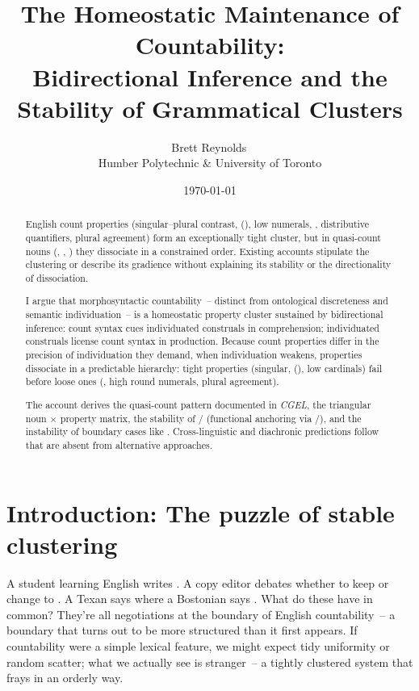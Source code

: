 \documentclass[12pt,a4paper]{article}
\title{The Homeostatic Maintenance of Countability:\\Bidirectional Inference and the Stability of Grammatical Clusters}
\author{Brett Reynolds\,\orcidlink{0000-0003-0073-7195}\\Humber Polytechnic \& University of Toronto}
\date{\today}
\begin{document}
\maketitle

\begin{abstract}
English count properties (singular--plural contrast, (), low numerals, , distributive quantifiers, plural agreement) form an exceptionally tight cluster, but in quasi-count nouns (, , ) they dissociate in a constrained order. Existing accounts stipulate the clustering or describe its gradience without explaining its stability or the directionality of dissociation.

I argue that morphosyntactic countability~-- distinct from ontological discreteness and semantic individuation~-- is a homeostatic property cluster sustained by bidirectional inference: count syntax cues individuated construals in comprehension; individuated construals license count syntax in production. Because count properties differ in the precision of individuation they demand, when individuation weakens, properties dissociate in a predictable hierarchy: tight properties (singular, (), low cardinals) fail before loose ones (, high round numerals, plural agreement).

The account derives the quasi-count pattern documented in \textit{CGEL}, the triangular noun $\times$ property matrix, the stability of / (functional anchoring via /), and the instability of boundary cases like . Cross-linguistic and diachronic predictions follow that are absent from alternative approaches.
\end{abstract}

\section{Introduction: The puzzle of stable clustering}

A student learning English writes . A copy editor debates whether to keep  or change to . A Texan says  where a Bostonian says . What do these have in common? They're all negotiations at the boundary of English countability~-- a boundary that turns out to be more structured than it first appears. If countability were a simple lexical feature, we might expect tidy uniformity or random scatter; what we actually see is stranger~-- a tightly clustered system that frays in an orderly way.
\end{document}
